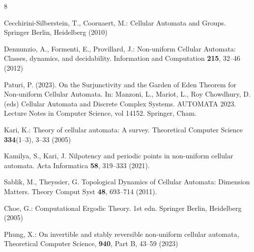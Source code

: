 \documentclass[runningheads]{llncs}
\begin{document}
%
%
%
% 
% 
%
\begin{thebibliography}{8}


 Cecchirini-Silberstein, T., Coornaert, M.: Cellular Automata and Groups. Springer Berlin, Heidelberg (2010)

Dennunzio, A., Formenti, E., Provillard, J.: Non-uniform Cellular Automata: Classes, dynamics, and decidability. Information and Computation \textbf{215}, 32--46 (2012)

 Paturi, P. (2023). On the Surjunctivity and the Garden of Eden Theorem for Non-uniform Cellular Automata. In: Manzoni, L., Mariot, L., Roy Chowdhury, D. (eds) Cellular Automata and Discrete Complex Systems. AUTOMATA 2023. Lecture Notes in Computer Science, vol 14152. Springer, Cham. 

 Kari, K.: Theory of cellular automata: A survey. Theoretical Computer Science \textbf{334}(1--3), 3--33 (2005)

 Kamilya, S., Kari, J. Nilpotency and periodic points in non-uniform cellular automata. Acta Informatica \textbf{58}, 319--333 (2021). 

 Sablik, M., Theyssier, G. Topological Dynamics of Cellular Automata: Dimension Matters. Theory Comput Syst \textbf{48}, 693--714 (2011). 

 Choe, G.: Computational Ergodic Theory. 1st edn. Springer Berlin, Heidelberg (2005) %

  Phung, X.: On invertible and stably reversible non-uniform cellular automata, Theoretical Computer Science, \textbf{940}, Part B, 43--59 (2023)

%
%
%
%
\end{thebibliography}
\end{document}

